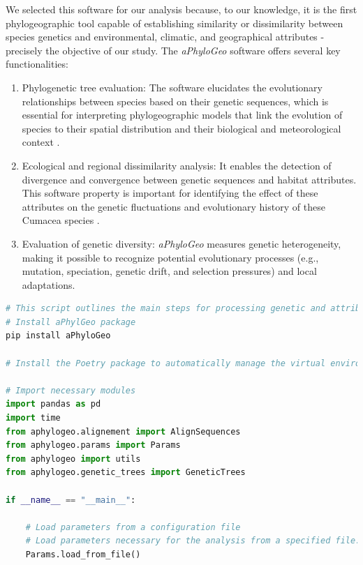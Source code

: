 {We selected this software for our analysis because, to our knowledge, it is the first phylogeographic tool capable of establishing similarity or dissimilarity between species genetics and environmental, climatic, and geographical attributes \citep{koshkarov_phylogeography_2022} - precisely the objective of our study. The \textit{aPhyloGeo} software offers several key functionalities:

\begin{enumerate}[label=\arabic*.]
\item Phylogenetic tree evaluation: The software elucidates the evolutionary relationships between species based on their genetic sequences, which is essential for interpreting phylogeographic models that link the evolution of species to their spatial distribution and their biological and meteorological context \citep{koshkarov_phylogeography_2022}.
\item Ecological and regional dissimilarity analysis: It enables the detection of divergence and convergence between genetic sequences and habitat attributes. This software property is important for identifying the effect of these attributes on the genetic fluctuations and evolutionary history of these Cumacea species \citep{koshkarov_phylogeography_2022}.
\item Evaluation of genetic diversity: \textit{aPhyloGeo} measures genetic heterogeneity, making it possible to recognize potential evolutionary processes (e.g., mutation, speciation, genetic drift, and selection pressures) and local adaptations.
\end{enumerate}

\begin{lstlisting}[label=lst:main,language=Python,caption=Main script for tutorial using the aPhyloGeo package.]
# This script outlines the main steps for processing genetic and attribute data using the aPhyloGeo package.
# Install aPhylGeo package
pip install aPhyloGeo

# Install the Poetry package to automatically manage the virtual environment

# Import necessary modules
import pandas as pd
import time
from aphylogeo.alignement import AlignSequences
from aphylogeo.params import Params
from aphylogeo import utils
from aphylogeo.genetic_trees import GeneticTrees
    
if __name__ == "__main__":

    # Load parameters from a configuration file
    # Load parameters necessary for the analysis from a specified file.
    Params.load_from_file()


\end{lstlisting}}
